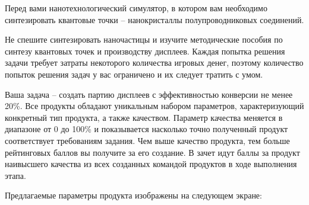 
Перед вами нанотехнологический симулятор, в котором вам необходимо синтезировать квантовые точки -- нанокристаллы полупроводниковых соединений. 

Не спешите синтезировать наночастицы и изучите методические пособия по синтезу квантовых точек и производству дисплеев. Каждая попытка решения задачи требует затраты некоторого количества игровых денег, поэтому количество попыток решения задач у вас ограничено и их следует тратить с умом.

Ваша задача -- создать партию дисплеев с эффективностью конверсии не менее 20\%. Все продукты обладают уникальным набором параметров, характеризующий конкретный тип продукта, а также качеством. Параметр качества меняется в диапазоне от 0 до 100\% и показывается насколько точно полученный продукт соответствует требованиям задания. Чем выше качество продукта, тем больше рейтинговых баллов вы получите за его создание. В зачет идут баллы за продукт наивысшего качества из всех созданных командой продуктов в ходе выполнения этапа.

Предлагаемые параметры продукта изображены на следующем экране:
